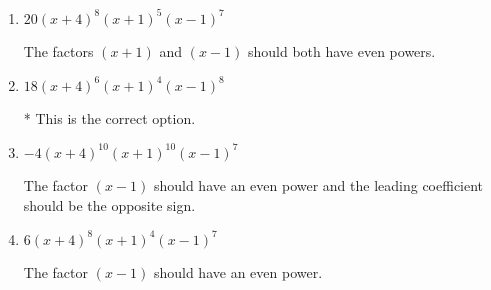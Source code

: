 \documentclass{extbook}[14pt]
\begin{document}
\begin{enumerate}
{\begin{enumerate}[label=\Alph*.]
This corresponds to the leading coefficient being the opposite value than it should be.
\item \( 20(x + 4)^{8} (x + 1)^{5} (x - 1)^{7} \)

The factors $(x + 1)$ and $(x - 1)$ should both have even powers.
\item \( 18(x + 4)^{6} (x + 1)^{4} (x - 1)^{8} \)

* This is the correct option.
\item \( -4(x + 4)^{10} (x + 1)^{10} (x - 1)^{7} \)

The factor $(x - 1)$ should have an even power and the leading coefficient should be the opposite sign.
\item \( 6(x + 4)^{8} (x + 1)^{4} (x - 1)^{7} \)

The factor $(x - 1)$ should have an even power.
\end{enumerate}

}
\end{enumerate}
\end{document}
